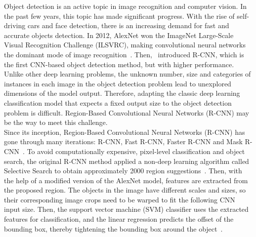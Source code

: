 Object detection is an active topic in image recognition and computer vision. In the past few years, this topic has made significant progress. With the rise of self-driving cars and face detection, there is an increasing demand for fast and accurate objects detection. In 2012, AlexNet won the ImageNet Large-Scale Visual Recognition Challenge (ILSVRC), making convolutional neural networks the dominant mode of image recognition~\cite{krizhevsky2012imagenet}. Then,~ introduced R-CNN, which is the first CNN-based object detection method, but with higher performance.\\

Unlike other deep learning problems, the unknown number, size and categories of instances in each image in the object detection problem lead to unexplored dimensions of the model output. Therefore, adapting the classic deep learning classification model that expects a fixed output size to the object detection problem is difficult. Region-Based Convolutional Neural Networks (R-CNN) may be the way to meet this challenge.\\

Since its inception, Region-Based Convolutional Neural Networks (R-CNN) has gone through many iterations: R-CNN, Fast R-CNN, Faster R-CNN and Mask R-CNN~\cite{girshick2014rich, girshick2015fast, ren2015faster, he2017mask}. To avoid computationally expensive, pixel-level classification and object search, the original R-CNN method applied a non-deep learning algorithm called Selective Search to obtain approximately 2000 region suggestions~\cite{uijlings2013selective, girshick2014rich}. Then, with the help of a modified version of the AlexNet model, features are extracted from the proposed region. The objects in the image have different scales and sizes, so their corresponding image crops need to be warped to fit the following CNN input size. Then, the support vector machine (SVM) classifier uses the extracted features for classification, and the linear regression predicts the offset of the bounding box, thereby tightening the bounding box around the object~\cite{girshick2014rich}.\\

